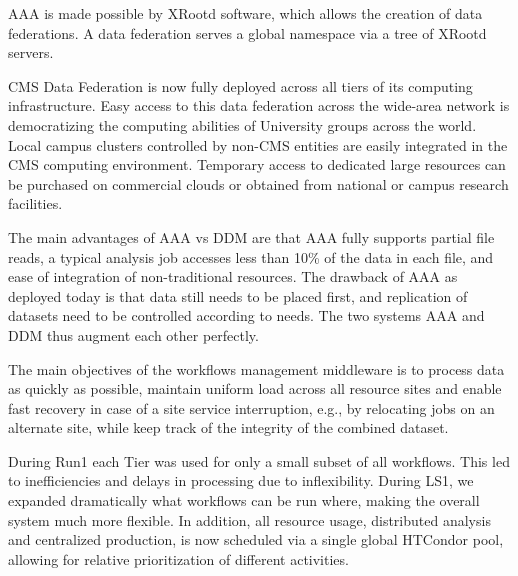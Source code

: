 \documentclass[11pt,a4paper]{article}
\begin{document}
AAA is made possible by XRootd software, which allows the creation of
data federations. A data federation serves a global namespace via a
tree of XRootd servers. 

CMS Data Federation is now fully deployed across all tiers of its
computing infrastructure. Easy access to this data federation across
the wide-area network is democratizing the computing abilities of
University groups across the world. Local campus clusters controlled by
non-CMS entities are easily integrated in the CMS computing
environment. Temporary access to dedicated large resources can be
purchased on commercial clouds or obtained from national or campus
research facilities.

The main advantages of AAA vs DDM are that AAA fully supports partial file reads,
a typical analysis job accesses less than 10\% of the data in each file, and ease of integration
of non-traditional resources. The drawback of AAA as deployed today is that data still needs to be placed first,
and replication of datasets need to be controlled according to needs. 
The two systems AAA and DDM thus augment each other perfectly.


The main objectives of the workflows management middleware is to
process data as quickly as possible, maintain uniform load across all
resource sites and enable fast recovery in case of a site service
interruption, e.g., by relocating jobs on an alternate site, while
keep track of the integrity of the combined dataset.  

During Run1 each Tier was used for only a small subset of all workflows.
This led to inefficiencies and delays in processing due to inflexibility.
During LS1, we expanded dramatically what workflows can be run where, making the overall system
much more flexible. In addition, all resource usage, distributed analysis and centralized production,
is now scheduled via a single global HTCondor pool, allowing for relative prioritization of different
activities.
\end{document}
